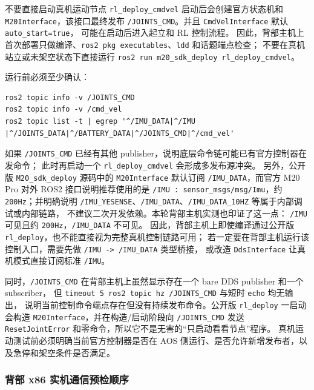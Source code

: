 \documentclass[UTF8,11pt,a4paper]{ctexart}
\begin{document}
\begin{redbox}{不要直接启动真机运动节点}
\texttt{rl\_deploy\_cmdvel} 启动后会创建官方状态机和 \texttt{M20Interface}，该接口最终发布
\texttt{/JOINTS\_CMD}。并且 \texttt{CmdVelInterface} 默认 \texttt{auto\_start=true}，
可能在启动后进入起立和 RL 控制流程。
因此，背部主机上首次部署只做编译、\texttt{ros2 pkg executables}、\texttt{ldd} 和话题端点检查；
不要在真机站立或未架空状态下直接运行 \texttt{ros2 run m20\_sdk\_deploy rl\_deploy\_cmdvel}。
\end{redbox}

运行前必须至少确认：

\begin{verbatim}
ros2 topic info -v /JOINTS_CMD
ros2 topic info -v /cmd_vel
ros2 topic list -t | egrep '^/IMU_DATA|^/IMU |^/JOINTS_DATA|^/BATTERY_DATA|^/JOINTS_CMD|^/cmd_vel'
\end{verbatim}

如果 \texttt{/JOINTS\_CMD} 已经有其他 publisher，说明底层命令链可能已有官方控制器在发命令；
此时再启动一个 \texttt{rl\_deploy\_cmdvel} 会形成多发布源冲突。
另外，公开版 \texttt{M20\_sdk\_deploy} 源码中的 \texttt{M20Interface} 默认订阅
\texttt{/IMU\_DATA}，而官方 M20 Pro 对外 ROS2 接口说明推荐使用的是
\texttt{/IMU : sensor\_msgs/msg/Imu}，约 \texttt{200Hz}；并明确说明
\texttt{/IMU\_YESENSE}、\texttt{/IMU\_DATA}、\texttt{/IMU\_DATA\_10HZ} 等属于内部调试或内部链路，
不建议二次开发依赖。本轮背部主机实测也印证了这一点：
\texttt{/IMU} 可见且约 \texttt{200Hz}，\texttt{/IMU\_DATA} 不可见。
因此，背部主机上即使编译通过公开版 \texttt{rl\_deploy}，也不能直接视为完整真机控制链路可用；
若一定要在背部主机运行该控制入口，需要先做 \texttt{/IMU -> /IMU\_DATA} 类型桥接，
或改造 \texttt{DdsInterface} 让真机模式直接订阅标准 \texttt{/IMU}。

同时，\texttt{/JOINTS\_CMD} 在背部主机上虽然显示存在一个 bare DDS publisher 和一个 subscriber，
但 \texttt{timeout 5 ros2 topic hz /JOINTS\_CMD} 与短时 \texttt{echo} 均无输出，
说明当前控制命令端点存在但没有持续发布命令。公开版 \texttt{rl\_deploy} 一启动会构造
\texttt{M20Interface}，并在构造/启动阶段向 \texttt{/JOINTS\_CMD} 发送
\texttt{ResetJointError} 和零命令，所以它不是无害的“只启动看看节点”程序。
真机运动测试前必须明确当前官方控制器是否在 AOS 侧运行、是否允许新增发布者，以及急停和架空条件是否满足。

\subsubsection{背部 x86 实机通信预检顺序}
\end{document}
